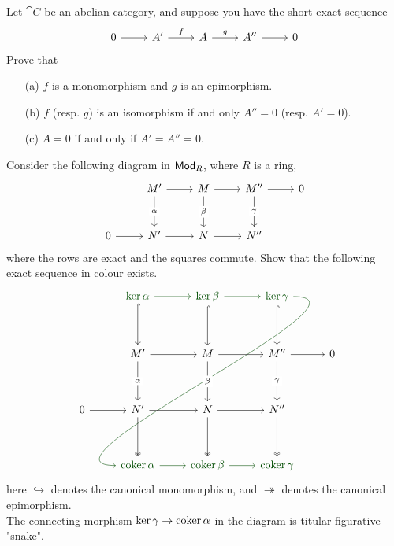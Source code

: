 \vspace*{0.1in}

\begin{problem}\label{prob C.6}
Let $\cat{C}$ be an abelian category, and suppose you have the short exact sequence
\[\begin{tikzcd}
0 \arrow[r] & A' \arrow[r,"f"] & A \arrow[r,"g"] & A'' \arrow[r] & 0
\end{tikzcd}\]
Prove that
\begin{itemize}
\item[(a)] $f$ is a monomorphism and $g$ is an epimorphism.
\item[(b)] $f$ (resp. $g$) is an isomorphism if and only $A'' = 0$ (resp. $A' = 0$).
\item[(c)] $A = 0$ if and only if $A' = A'' = 0$.
\end{itemize}
\end{problem}

\vspace*{0.1in}

\begin{problem}\label{prob C.7}
Consider the following diagram in $\mathsf{Mod}_R$, where $R$ is a ring,
\[\begin{tikzcd}
  & M'\arrow[d,"\alpha" description] \rar & M \rar\arrow[d,"\beta" description] & M'' \rar\arrow[d,"\gamma" description] & 0 \\[1em]
  0 \rar & N' \rar & N \rar & N'' &
\end{tikzcd}\]
where the rows are exact and the squares commute. Show that the following exact sequence in colour exists.
\[\begin{tikzcd}[row sep=huge]
  & {\color{darkgreen}\ker\alpha} \rar[darkgreen] \arrow[d,hook] & {\color{darkgreen}\ker\beta} \rar[darkgreen] \arrow[d,hook] & {\color{darkgreen}\ker\gamma} \arrow[d,hook] \ar[out=0, in=180, darkgreen]{dddll} & \\
  & M'\arrow[d,"\alpha" description] \rar & M \rar\arrow[d,"\beta" description] & M'' \rar\arrow[d,"\gamma" description] & 0\\
  0 \rar & N' \rar \arrow[d,two heads] & N \rar \arrow[d,two heads] & N'' \arrow[d,two heads] & \\
   & {\color{darkgreen}\cok \alpha} \rar[darkgreen] & {\color{darkgreen}\cok \beta} \rar[darkgreen] & {\color{darkgreen}\cok \gamma} &
\end{tikzcd}\]
here $\hookrightarrow$ denotes the canonical monomorphism, and $\twoheadrightarrow$ denotes the canonical epimorphism.\\[1em]
The connecting morphism $\ker \gamma \to \operatorname{coker} \alpha$ in the diagram is titular figurative "snake".
\end{problem}

